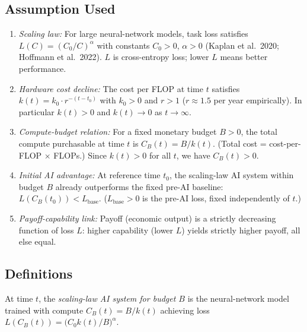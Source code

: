 

\subsection*{Assumption Used}

\begin{assumption}\label{A1}
  \begin{enumerate}
    \item \emph{Scaling law:} For large neural-network models, task loss
      satisfies $L(C) = (C_0/C)^{\alpha}$ with constants $C_0 > 0$,
      $\alpha > 0$ (Kaplan et al.\ 2020; Hoffmann et al.\ 2022).
      $L$ is cross-entropy loss; lower $L$ means better performance.
    \item \emph{Hardware cost decline:} The cost per FLOP at time $t$
      satisfies $k(t) = k_0 \cdot r^{-(t-t_0)}$ with $k_0 > 0$ and
      $r > 1$ ($r \approx 1.5$ per year empirically).
      In particular $k(t) > 0$ and $k(t) \to 0$ as $t \to \infty$.
    \item \emph{Compute-budget relation:} For a fixed monetary budget
      $B > 0$, the total compute purchasable at time $t$ is
      $C_B(t) = B / k(t)$.  (Total cost = cost-per-FLOP $\times$ FLOPs.)
      Since $k(t) > 0$ for all $t$, we have $C_B(t) > 0$.
    \item \emph{Initial AI advantage:} At reference time $t_0$, the
      scaling-law AI system within budget $B$ already outperforms the
      fixed pre-AI baseline:
      $L(C_B(t_0)) < L_{\mathrm{base}}$.
      ($L_{\mathrm{base}} > 0$ is the pre-AI loss, fixed independently
      of $t$.)
    \item \emph{Payoff-capability link:} Payoff (economic output) is a
      strictly decreasing function of loss $L$: higher capability
      (lower $L$) yields strictly higher payoff, all else equal.
  \end{enumerate}
\end{assumption}

\subsection*{Definitions}

\begin{definition}
  At time $t$, the \emph{scaling-law AI system for budget $B$} is the
  neural-network model trained with compute $C_B(t) = B/k(t)$ achieving
  loss $L(C_B(t)) = \bigl(C_0 k(t)/B\bigr)^{\alpha}$.
\end{definition}

